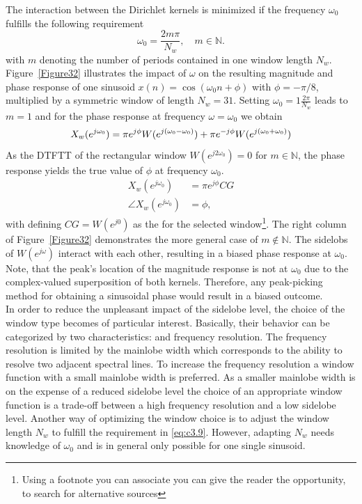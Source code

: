 \noindent The interaction between the Dirichlet kernels is minimized if the frequency $\omega_0$ fulfills the following requirement
\begin{equation}\label{eq:c3.9}
\omega_0=\frac{2{m}\pi}{N_w}, \quad m\in\mathbb{N}.
\end{equation}
with $m$ denoting the number of periods contained in one window length $N_w$. Figure~\ref{Figure32} illustrates the impact of $\omega$ on the resulting magnitude and phase response of one sinusoid $x(n)=\cos(\omega_0 n+\phi)$ with $\phi=-\pi/8$, multiplied by a symmetric window of length $N_w=31$. Setting $\omega_0=1\frac{2\pi}{N_w}$ leads to $m=1$ and for the phase response at frequency $\omega=\omega_0$ we obtain
\begin{equation}
X_w(e^{j\omega_0})=\pi e^{j\phi}W(e^{j(\omega_0-\omega_0)})+\pi e^{-j\phi}W(e^{j(\omega_0+\omega_0)})\\
\end{equation}
As the \gls{DTFT}T of the rectangular window $W(e^{j2\omega_0})=0$ for $m\in\mathbb{N}$, the phase response yields the true value of $\phi$ at frequency $\omega_0$.
\begin{align}\label{eq:c3.10}
	X_w(e^{j\omega_0})&=\pi e^{j\phi} CG\\
	\angle X_w(e^{j\omega_0})&=\phi,
\end{align}
with defining $CG=W(e^{j0})$ as the  for the selected window\footnote{Using a footnote you can associate you can give the reader the opportunity, to search for alternative sources}. The right column of Figure~\ref{Figure32} demonstrates the more general case of $m\notin\mathbb{N}$. The sidelobs of $W(e^{j\omega})$ interact with each other, resulting in a biased phase response at $\omega_0$. Note, that the peak's location of the magnitude response is not at $\omega_0$ due to the complex-valued superposition of both kernels. Therefore, any peak-picking method for obtaining a sinusoidal phase would result in a biased outcome.\\

\noindent In order to reduce the unpleasant impact of the sidelobe level, the choice of the window type becomes of particular interest. Basically, their behavior can be categorized by two characteristics:  and {frequency resolution}. The frequency resolution is limited by the mainlobe width which corresponds to the ability to resolve two adjacent spectral lines. To increase the frequency resolution a window function with a small mainlobe width is preferred. As a smaller mainlobe width is on the expense of a reduced sidelobe level the choice of an appropriate window function is a trade-off between a high frequency resolution and a low sidelobe level. Another way of optimizing the window choice is to adjust the window length $N_w$ to fulfill the requirement in \eqref{eq:c3.9}. However, adapting $N_w$ needs knowledge of $\omega_0$ and is in general only possible for one single sinusoid. \\

